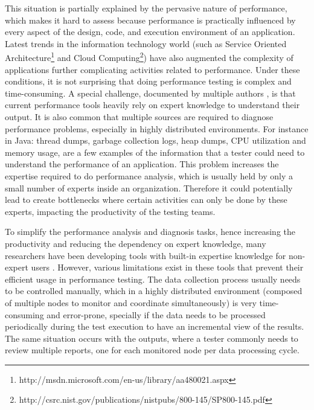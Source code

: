 \documentclass[runningheads,a4paper]{llncs}
\begin{document}
This situation is partially explained by the pervasive nature of
performance, which makes it hard to assess because performance is practically
influenced by every aspect of the design, code, and execution environment
of an application. Latest trends in the information technology world (such as
Service Oriented
Architecture\footnote{http://msdn.microsoft.com/en-us/library/aa480021.aspx} and 
Cloud Computing\footnote{http://csrc.nist.gov/publications/nistpubs/800-145/SP800-145.pdf}) 
have also augmented the complexity of applications further complicating activities related to
performance. Under these conditions, it is not surprising that doing performance
testing is complex and time-consuming. A special challenge, documented by
multiple authors \cite{Woodside2007,trevor1,Angelopoulos2012}, is that current
performance tools heavily rely on expert knowledge to understand their output.
It is also common that multiple sources are required to diagnose
performance problems, especially in highly distributed environments. For
instance in Java: thread dumps, garbage collection logs, heap dumps, CPU
utilization and memory usage, are a few examples of the information that a
tester could need to understand the performance of an application.
This problem increases the expertise required to do performance analysis,
which is usually held by only a small number of experts inside an
organization\cite{Wyatt1}. Therefore it could potentially lead to
create bottlenecks where certain activities can only be done by these experts,
impacting the productivity of the testing teams\cite{Angelopoulos2012}.

To simplify the performance analysis and diagnosis tasks, hence increasing the
productivity and reducing the dependency on expert knowledge, many researchers
have been developing tools with built-in expertise knowledge for non-expert
users \cite{Altman2010,pat7,Angelopoulos2012}. However, various limitations
exist in these tools that prevent their efficient usage in performance testing.
The data collection process usually needs to be controlled manually, which in a
highly distributed environment (composed of multiple nodes to monitor and
coordinate simultaneously) is very time-consuming and error-prone, specially if
the data needs to be processed periodically during the test execution to have an
incremental view of the results. The same situation occurs with the outputs,
where a tester commonly needs to review multiple reports, one for each monitored
node per data processing cycle.
\end{document}
